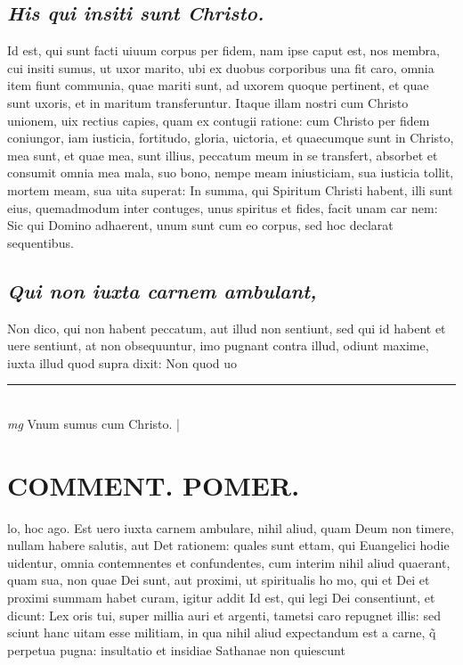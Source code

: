 \documentclass{article}
\begin{document}
\begin{pages}
\subsection*{\textit{His qui insiti sunt Christo. }}\pstart Id est, qui sunt facti uiuum corpus per fidem, nam ipse caput est, nos membra, cui insiti sumus, ut uxor marito, ubi ex duobus corporibus una fit caro, omnia item fiunt communia, quae mariti sunt, ad uxorem quoque pertinent, et quae sunt uxoris, et in maritum transferuntur. Itaque illam nostri cum Christo unionem, uix rectius capies, quam ex contugii ratione: cum Christo per fidem coniungor, iam iusticia, fortitudo, gloria, uictoria, et quaecumque sunt in Christo, mea sunt, et quae mea, sunt illius, peccatum meum in se transfert, absorbet et consumit omnia mea mala, suo bono, nempe meam iniusticiam, sua iusticia tollit, mortem meam, sua uita superat: In summa, qui Spiritum Christi habent, illi sunt eius, quemadmodum inter contuges, unus spiritus et fides, facit unam car nem: Sic qui Domino adhaerent, unum sunt cum eo corpus, sed hoc declarat sequentibus.   \pend
{}
{}
\subsection*{\textit{Qui non iuxta carnem ambulant, }}\pstart Non dico, qui non habent peccatum, aut illud non sentiunt, sed qui id habent et uere sentiunt, at non obsequuntur, imo pugnant contra illud, odiunt maxime, iuxta illud quod supra dixit: Non quod uo\pend
\vspace{0.5cm}\noindent
\vspace{0.2cm}\rule{1cm}{0.2pt}\\ 
\hspace{0.2cm}\textit{mg}
\footnotesize Vnum sumus cum Christo.  
\normalsize| 
\section*{COMMENT. POMER.  }\pstart lo, hoc ago. Est uero iuxta carnem ambulare, nihil aliud, quam Deum non timere, nullam habere salutis, aut Det rationem: quales sunt ettam, qui Euangelici hodie uidentur, omnia contemnentes et confundentes, cum interim nihil aliud quaerant, quam sua, non quae Dei sunt, aut proximi, ut spiritualis ho mo, qui et Dei et proximi summam habet curam, igitur addit  \pend\pstart Id est, qui legi Dei consentiunt, et dicunt: Lex oris tui, super millia auri et argenti, tametsi caro repugnet illis: sed sciunt hanc uitam esse militiam, in qua nihil aliud expectandum est a carne, q̃ perpetua pugna: insultatio et insidiae Sathanae non quiescunt\pend
{}
{}

\end{pages}
\end{document}
